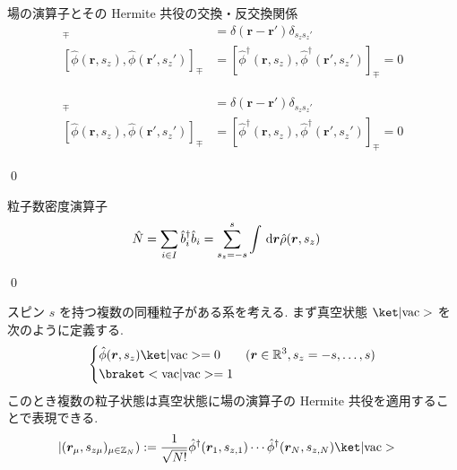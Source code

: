 \documentclass[uplatex,dvipdfmx,a4paper,11pt]{jlreq}
\makeatletter
\newcommand{\RR}{\mathbb{R}}
\newcommand{\ZZ}{\mathbb{Z}}
\newcommand{\rr}{\bm{r}}
\numberwithin{equation}{section}
\theoremstyle{definition}
\renewenvironment{proof}[1][\proofname]{\par
  \normalfont
  \topsep6\p@\@plus6\p@ \trivlist
  \item[\hskip\labelsep{\bfseries #1}\@addpunct{\bfseries}]\ignorespaces\quad\par
}{
  \qed\endtrivlist\@endpefalse
}
\renewcommand\proofname{証明}
\makeatother
\begin{document}
\begin{theorem}
  場の演算子とその Hermite 共役の交換・反交換関係
  \begin{align}
    [\hat{\phi}(\rr, s_z), \hat{\phi}^\dagger(\rr', s_z')]_\mp & = \delta(\rr - \rr')\delta_{s_zs_z'}                                     \\
    [\hat{\phi}(\rr, s_z), \hat{\phi}(\rr', s_z')]_\mp         & = [\hat{\phi}^\dagger(\rr, s_z), \hat{\phi}^\dagger(\rr', s_z')]_\mp = 0
  \end{align}
\end{theorem}
\begin{proof}
  \begin{align}
    [\hat{\phi}(\rr, s_z), \hat{\phi}^\dagger(\rr', s_z')]_\mp & = \delta(\rr - \rr')\delta_{s_zs_z'}                                     \\
    [\hat{\phi}(\rr, s_z), \hat{\phi}(\rr', s_z')]_\mp         & = [\hat{\phi}^\dagger(\rr, s_z), \hat{\phi}^\dagger(\rr', s_z')]_\mp = 0
  \end{align}
\end{proof}

\begin{theorem}
  粒子数密度演算子
  \begin{align}
    \hat{N} & = \sum_{i\in I}\hat{b}_i^\dagger\hat{b}_i = \sum_{s_z = -s}^{s}\int\dl{\rr}\hat{\rho}(\rr, s_z)
  \end{align}
\end{theorem}
\begin{proof}

\end{proof}

\begin{definition}[複数の同種粒子の場]
  スピン $s$ を持つ複数の同種粒子がある系を考える.
  まず真空状態 $\ket|\mathrm{vac}>$ を次のように定義する.
  \begin{align}
    \begin{dcases}
      \hat{\phi}(\rr, s_z)\ket|\mathrm{vac}> = 0 & (\rr\in\RR^3, s_z = -s,\ldots,s) \\
      \braket<\mathrm{vac}|\mathrm{vac}> = 1
    \end{dcases}
  \end{align}
  このとき複数の粒子状態は真空状態に場の演算子の Hermite 共役を適用することで表現できる.
  \begin{align}
    |(\rr_\mu, s_{z\mu})_{\mu\in\ZZ_N}) & := \frac{1}{\sqrt{N!}}\hat{\phi}^\dagger(\rr_1, s_{z,1})\cdots\hat{\phi}^\dagger(\rr_N, s_{z,N})\ket|\mathrm{vac}>
  \end{align}
\end{definition}
\end{document}

